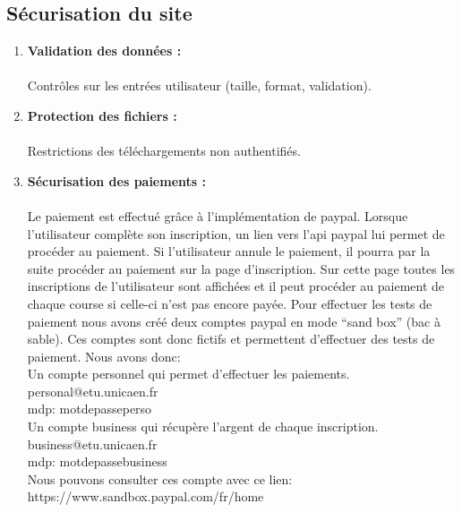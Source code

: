 \documentclass[12pt]{article} %
\begin{document}
	\subsection{Sécurisation du site}
        \begin{enumerate}
            \item \textbf{Validation des données :}\\ \\
                Contrôles sur les entrées utilisateur (taille, format, validation).
            \item \textbf{Protection des fichiers :}\\ \\
                Restrictions des téléchargements non authentifiés.
            \item \textbf{Sécurisation des paiements :}\\ \\
                Le paiement est effectué grâce à l'implémentation de paypal. Lorsque l'utilisateur complète son inscription, un lien vers l’api paypal lui permet de procéder au paiement. Si l'utilisateur annule le paiement, il pourra par la suite procéder au paiement sur la page d’inscription. Sur cette page toutes les inscriptions de l'utilisateur sont affichées et il peut procéder au paiement de chaque course si celle-ci n'est pas encore payée. Pour effectuer les tests de paiement nous avons créé deux comptes paypal en mode “sand box” (bac à sable). Ces comptes sont donc fictifs et permettent d'effectuer des tests de paiement. Nous avons donc:\\
                Un compte personnel qui permet d'effectuer les paiements.\\
                personal@etu.unicaen.fr\\
                mdp: motdepasseperso\\
                Un compte business qui récupère l’argent de chaque inscription.\\
                business@etu.unicaen.fr\\
                mdp: motdepassebusiness\\
                Nous pouvons consulter ces compte avec ce lien:\\  https://www.sandbox.paypal.com/fr/home\\

        \end{enumerate}
\end{document}
